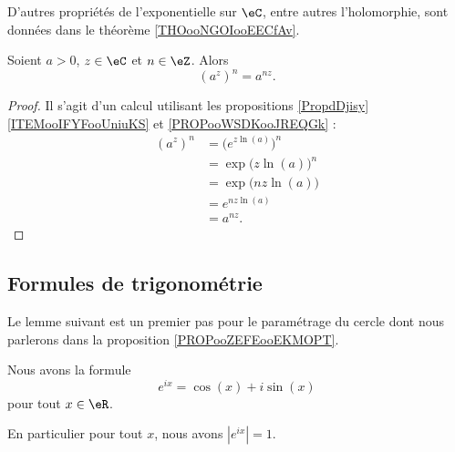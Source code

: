D'autres propriétés de l'exponentielle sur \( \eC\), entre autres l'holomorphie, sont données dans le théorème \ref{THOooNGOIooEECfAv}.

\begin{lemma}        \label{LEMooTDGKooWdpUTD}
    Soient \( a>0\), \( z\in \eC\) et \( n\in \eZ\). Alors
    \begin{equation}
        (a^z)^n=a^{nz}.
    \end{equation}
\end{lemma}

\begin{proof}
    Il s'agit d'un calcul utilisant les propositions \ref{PropdDjisy}\ref{ITEMooIFYFooUniuKS} et \ref{PROPooWSDKooJREQGk} :
    \begin{subequations}
        \begin{align}
            (a^z)^n&=\big(  e^{z\ln(a)} \big)^n\\
            &=\exp\big( z\ln(a) \big)^n\\
            &=\exp\big( nz\ln(a) \big)\\
            &= e^{nz\ln(a)}\\
            &=a^{nz}.
        \end{align}
    \end{subequations}
\end{proof}

\subsection{Formules de trigonométrie}

Le lemme suivant est un premier pas pour le paramétrage du cercle dont nous parlerons dans la proposition \ref{PROPooZEFEooEKMOPT}.
\begin{lemma}       \label{LEMooHOYZooKQTsXW}
    Nous avons la formule
    \begin{equation}        \label{EQooRVPJooTMwNTU}
        e^{ix}=\cos(x)+i\sin(x)
    \end{equation}
    pour tout \( x\in \eR\).

    En particulier pour tout \( x\), nous avons \( |  e^{ix} |=1\).
\end{lemma}


